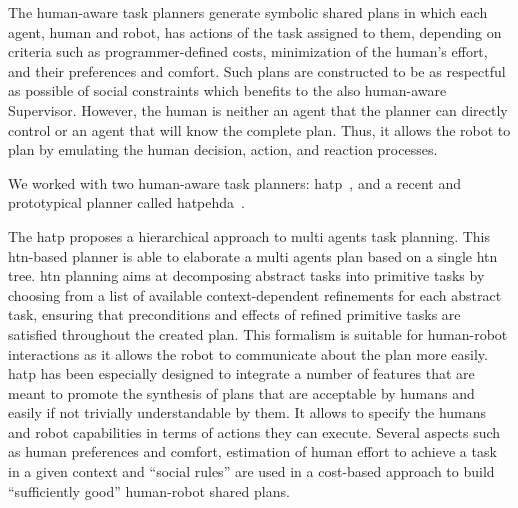 \documentclass[a4paper,11pt,twoside]{StyleThese}
\begin{document}
The human-aware task planners generate symbolic shared plans in which each agent, human and robot, has actions of the task assigned to them, depending on criteria such as programmer-defined costs, minimization of the human's effort, and their preferences and comfort. Such plans are constructed to be as respectful as possible of social constraints which benefits to the also human-aware Supervisor. However, the human is neither an agent that the planner can directly control or an agent that will know the complete plan. Thus, it allows the robot to plan by emulating the human decision, action, and reaction processes. 

We worked with two human-aware task planners: \acrfull{hatp}~\citep{lallement_2014_hatp}, and a recent and prototypical planner called \acrfull{hatpehda}~\citep{buisan_2021_human}.

The \acrfull{hatp} proposes a hierarchical approach to multi agents task planning. This \acrfull{htn}-based planner is able to elaborate a multi agents plan based on a single \acrshort{htn} tree. \acrshort{htn} planning aims at decomposing abstract tasks into primitive tasks by choosing from a list of available context-dependent refinements for each abstract task, ensuring that preconditions and effects of refined primitive tasks are satisfied throughout the created plan. This formalism is suitable for human-robot interactions as it allows the robot to communicate about the plan more easily. \acrshort{hatp} has been especially designed to integrate a number of features that are meant to promote the synthesis of plans that are acceptable by humans and easily if not trivially understandable by them. It allows to specify the humans and robot capabilities in terms of actions they can execute. Several aspects such as human preferences and comfort, estimation of human effort to achieve a task in a given context and ``social rules'' are used in a cost-based approach to build ``sufficiently good'' human-robot shared plans.
\end{document}
